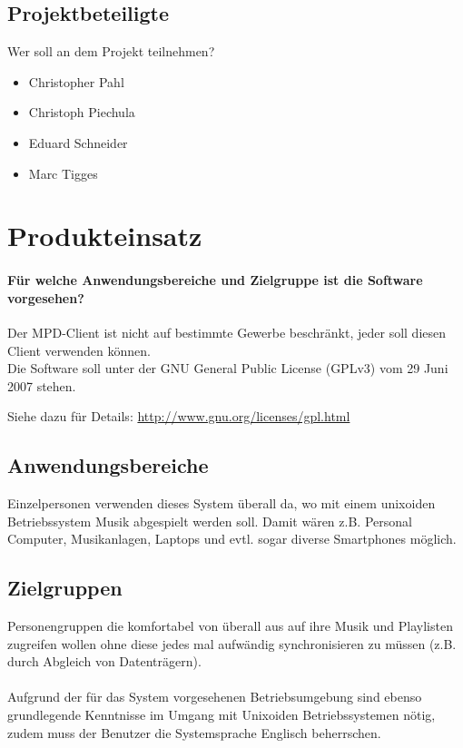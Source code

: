 \subsection{Projektbeteiligte}
Wer soll an dem Projekt teilnehmen?
\begin{itemize}
	\item Christopher Pahl
	\item Christoph Piechula
	\item Eduard Schneider
	\item Marc Tigges
\end{itemize}
\section{Produkteinsatz}
\paragraph{Für welche Anwendungsbereiche und Zielgruppe ist die Software vorgesehen?} 
Der MPD-Client ist nicht auf bestimmte Gewerbe beschränkt, jeder soll diesen
Client verwenden können. 
\\
Die Software soll unter der GNU General Public License (GPLv3) vom 29 Juni 2007 stehen.
\begin{center}
    Siehe dazu für Details: \url{http://www.gnu.org/licenses/gpl.html}
\end{center}

\subsection{Anwendungsbereiche}
Einzelpersonen verwenden dieses System überall da, wo mit
einem unixoiden Betriebssystem Musik abgespielt werden soll.
Damit wären z.B. Personal Computer, Musikanlagen, Laptops und evtl.
sogar diverse Smartphones möglich.

\subsection{Zielgruppen}
Personengruppen die komfortabel von überall aus auf ihre Musik und Playlisten zugreifen
wollen ohne diese jedes mal aufwändig synchronisieren zu müssen (z.B. durch Abgleich von Datenträgern).\ \\ \\
Aufgrund der für das System vorgesehenen Betriebsumgebung sind ebenso grundlegende Kenntnisse im Umgang mit Unixoiden 
Betriebssystemen nötig, zudem muss der Benutzer die Systemsprache Englisch beherrschen.

